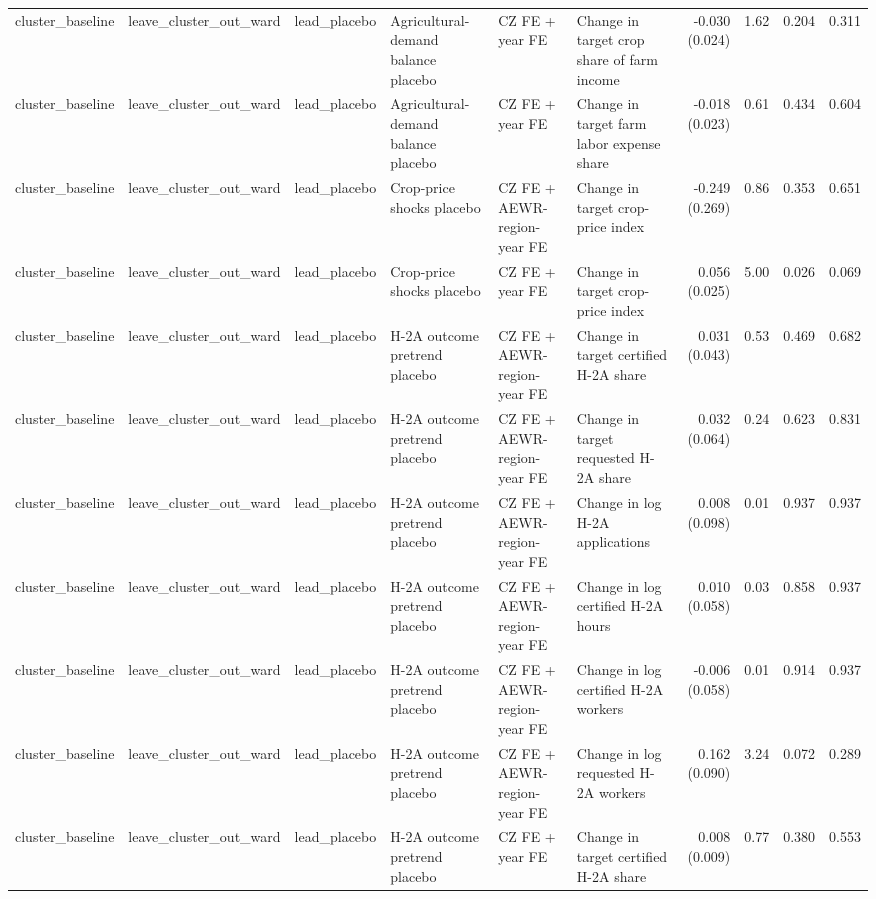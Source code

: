 \begin{tabular}{llllllrrrr}
cluster_baseline & leave_cluster_out_ward & lead_placebo & Agricultural-demand balance placebo & CZ FE + year FE & Change in target crop share of farm income & -0.030 (0.024) & 1.62 & 0.204 & 0.311 \\
cluster_baseline & leave_cluster_out_ward & lead_placebo & Agricultural-demand balance placebo & CZ FE + year FE & Change in target farm labor expense share & -0.018 (0.023) & 0.61 & 0.434 & 0.604 \\
cluster_baseline & leave_cluster_out_ward & lead_placebo & Crop-price shocks placebo & CZ FE + AEWR-region-year FE & Change in target crop-price index & -0.249 (0.269) & 0.86 & 0.353 & 0.651 \\
cluster_baseline & leave_cluster_out_ward & lead_placebo & Crop-price shocks placebo & CZ FE + year FE & Change in target crop-price index & 0.056 (0.025) & 5.00 & 0.026 & 0.069 \\
cluster_baseline & leave_cluster_out_ward & lead_placebo & H-2A outcome pretrend placebo & CZ FE + AEWR-region-year FE & Change in target certified H-2A share & 0.031 (0.043) & 0.53 & 0.469 & 0.682 \\
cluster_baseline & leave_cluster_out_ward & lead_placebo & H-2A outcome pretrend placebo & CZ FE + AEWR-region-year FE & Change in target requested H-2A share & 0.032 (0.064) & 0.24 & 0.623 & 0.831 \\
cluster_baseline & leave_cluster_out_ward & lead_placebo & H-2A outcome pretrend placebo & CZ FE + AEWR-region-year FE & Change in log H-2A applications & 0.008 (0.098) & 0.01 & 0.937 & 0.937 \\
cluster_baseline & leave_cluster_out_ward & lead_placebo & H-2A outcome pretrend placebo & CZ FE + AEWR-region-year FE & Change in log certified H-2A hours & 0.010 (0.058) & 0.03 & 0.858 & 0.937 \\
cluster_baseline & leave_cluster_out_ward & lead_placebo & H-2A outcome pretrend placebo & CZ FE + AEWR-region-year FE & Change in log certified H-2A workers & -0.006 (0.058) & 0.01 & 0.914 & 0.937 \\
cluster_baseline & leave_cluster_out_ward & lead_placebo & H-2A outcome pretrend placebo & CZ FE + AEWR-region-year FE & Change in log requested H-2A workers & 0.162 (0.090) & 3.24 & 0.072 & 0.289 \\
cluster_baseline & leave_cluster_out_ward & lead_placebo & H-2A outcome pretrend placebo & CZ FE + year FE & Change in target certified H-2A share & 0.008 (0.009) & 0.77 & 0.380 & 0.553 \\

\end{tabular}
